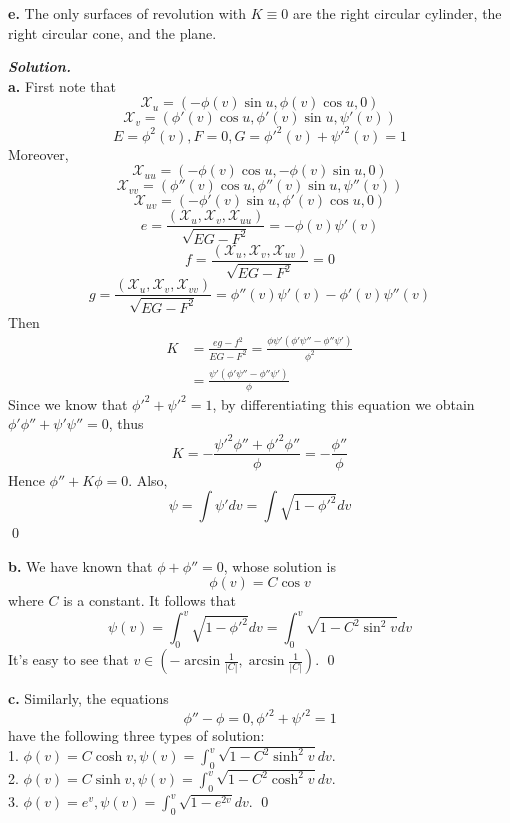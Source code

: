 \documentclass{article}
\begin{document}
\par
\textbf{e. }The only surfaces of revolution with $K \equiv 0$ are the right circular
cylinder, the right circular cone, and the plane.

\par
\textbf{\textit{Solution.}}\\
\textbf{a. }First note that
$$
    \mathcal{X}_u = (-\phi(v)\sin u, \phi(v) \cos u, 0)
$$
$$
    \mathcal{X}_v = (\phi'(v)\cos u, \phi'(v) \sin u, \psi'(v))
$$
$$
    E = \phi^2(v), F = 0, G = \phi'^2(v) + \psi'^2(v) = 1
$$
Moreover,
$$
    \mathcal{X}_{uu} = (-\phi(v)\cos u, -\phi(v) \sin u, 0)
$$
$$
    \mathcal{X}_{vv} = (\phi''(v)\cos u, \phi''(v) \sin u, \psi''(v))
$$
$$
    \mathcal{X}_{uv} = (-\phi'(v)\sin u, \phi'(v) \cos u, 0)
$$
$$
    e = \frac{(\mathcal{X}_u, \mathcal{X}_v, \mathcal{X}_{uu})}{\sqrt{EG-F^2}}
    = -\phi(v) \psi'(v)
$$
$$
    f = \frac{(\mathcal{X}_u, \mathcal{X}_v, \mathcal{X}_{uv})}{\sqrt{EG-F^2}}
    = 0
$$
$$
    g = \frac{(\mathcal{X}_u, \mathcal{X}_v, \mathcal{X}_{vv})}{\sqrt{EG-F^2}}
    = \phi''(v)\psi'(v) - \phi'(v)\psi''(v)
$$
Then
$$
\begin{aligned}
    K &= \frac{eg-f^2}{EG-F^2} = \frac{\phi\psi'(\phi'\psi''-\phi''\psi')}{\phi^2}\\
    &= \frac{\psi'(\phi'\psi''-\phi''\psi')}{\phi}
\end{aligned}
$$
Since we know that $\phi'^2 + \psi'^2 = 1$, by differentiating this equation we obtain
$\phi'\phi'' + \psi'\psi'' = 0$, thus
$$
    K = -\frac{\psi'^2\phi'' + \phi'^2\phi''}{\phi} = -\frac{\phi''}{\phi}
$$
Hence $\phi'' + K\phi = 0$. Also,
$$
    \psi = \int \psi'dv = \int \sqrt{1 - \phi'^2}dv
$$
\qed

\par
\textbf{b. }We have known that $\phi + \phi'' = 0$, whose solution is
$$
    \phi(v) = C \cos v
$$
where $C$ is a constant. It follows that
$$
    \psi(v) = \int_0^v \sqrt{1 - \phi'^2}dv = \int_0^v \sqrt{1 - C^2 \sin^2v}dv
$$
It's easy to see that $v \in (-\arcsin \frac{1}{|C|}, \arcsin \frac{1}{|C|})$.
\qed

\par
\textbf{c. } Similarly, the equations 
$$
\phi'' - \phi = 0, \phi'^2 + \psi'^2 = 1
$$
have the following three types of solution:\\
1. $\phi(v) = C\cosh v, \psi(v) = \int_0^v \sqrt{1-C^2 \sinh^2 v}dv.$\\
2. $\phi(v) = C\sinh v, \psi(v) = \int_0^v \sqrt{1-C^2 \cosh^2 v}dv.$\\
3. $\phi(v) = e^v, \psi(v) = \int_0^v \sqrt{1-e^{2v}}dv.$ \qed
\end{document}
